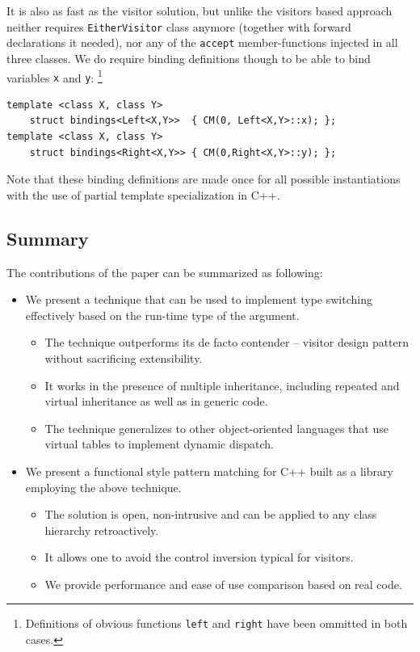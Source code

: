 \documentclass[preprint]{sigplanconf}
\makeatletter
\DeclareRobustCommand{\code}[1]{{\lstinline[breaklines=false,escapechar=@]{#1}}}
\makeatother
\begin{document}
It is also as fast as the visitor solution, but unlike the visitors based 
approach neither requires \code{EitherVisitor} class anymore (together with 
forward declarations it needed), nor any of the \code{accept} member-functions 
injected in all three classes. We do require binding definitions though to be 
able to bind variables \code{x} and \code{y}:
\footnote{Definitions of obvious functions \code{left} and \code{right} have 
been ommitted in both cases.}

\begin{lstlisting}[keepspaces,columns=flexible]
template <class X, class Y> 
    struct bindings<Left<X,Y>>  { CM(0, Left<X,Y>::x); };
template <class X, class Y> 
    struct bindings<Right<X,Y>> { CM(0,Right<X,Y>::y); };
\end{lstlisting}

Note that these binding definitions are made once for all possible instantiations 
with the use of partial template specialization in C++.

\subsection{Summary}

The contributions of the paper can be summarized as following:

\begin{itemize}
\item We present a technique that can be used to implement type switching 
      effectively based on the run-time type of the argument. 
  \begin{itemize}
  \item The technique outperforms its de facto contender -- visitor design 
        pattern without sacrificing extensibility.
  \item It works in the presence of multiple inheritance, including repeated and 
        virtual inheritance as well as in generic code.
  \item The technique generalizes to other object-oriented languages that use 
        virtual tables to implement dynamic dispatch.
  \end{itemize}
\item We present a functional style pattern matching for C++ built as a library 
      employing the above technique.
  \begin{itemize}
  \item The solution is open, non-intrusive and can be applied to any class 
        hierarchy retroactively.
  \item It allows one to avoid the control inversion typical for visitors.
  \item We provide performance and ease of use comparison based on real code.
  \end{itemize}
\end{itemize}
\end{document}

